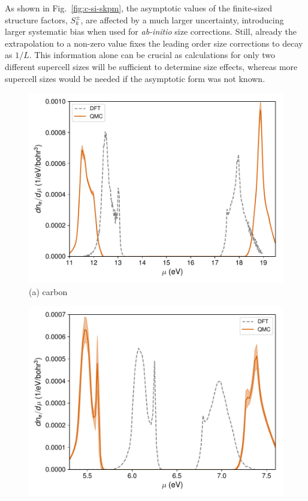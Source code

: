 As shown in Fig.~\ref{fig:c-si-skpm}, the asymptotic values of the finite-sized structure factors,
$S_k^\pm$, are affected by a much larger uncertainty, introducing larger systematic bias when
used for \emph{ab-initio} size corrections. Still, already the extrapolation to a non-zero
value fixes the leading order size corrections to decay as $1/L$. This information alone can be
crucial as calculations for only two different supercell sizes will be sufficient to determine size effects, whereas more supercell sizes would be needed if the asymptotic form was not known.

\begin{figure}
\begin{minipage}{\columnwidth}
\includegraphics[width=\linewidth]{si35f_nf-c-dndmu}
(a) carbon
\end{minipage}
\begin{minipage}{\columnwidth}
\includegraphics[width=\linewidth]{si35f_nf-si-dndmu}

\end{minipage}
\end{figure}
